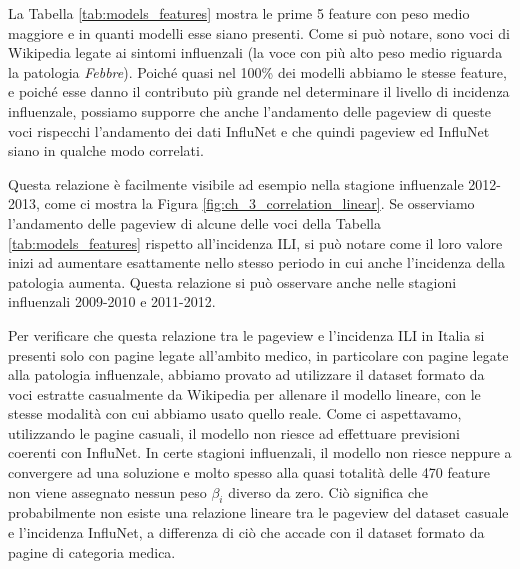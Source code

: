 La Tabella \ref{tab:models_features} mostra le prime 5 feature con peso medio maggiore e in quanti modelli 
esse siano presenti. Come si può notare, sono voci di Wikipedia legate ai sintomi influenzali (la voce con più alto 
peso medio riguarda la patologia \textit{Febbre}). Poiché quasi nel 100\% dei modelli abbiamo le stesse feature, e poiché 
esse danno il contributo più grande nel determinare il livello di incidenza influenzale, possiamo supporre che anche 
l'andamento delle pageview di queste voci rispecchi l'andamento dei dati InfluNet e che quindi pageview ed InfluNet siano in 
qualche modo correlati.
\bigskip

Questa relazione è facilmente visibile ad esempio nella stagione influenzale 2012-2013, come ci mostra la Figura 
\ref{fig:ch_3_correlation_linear}. Se osserviamo l'andamento delle pageview di alcune delle voci della Tabella 
\ref{tab:models_features} rispetto all'incidenza ILI, si può notare come il loro valore inizi ad aumentare esattamente 
nello stesso periodo in cui anche l'incidenza della patologia aumenta. Questa relazione si può osservare anche nelle stagioni 
influenzali 2009-2010 e 2011-2012.
\bigskip

Per verificare che questa relazione tra le pageview e l'incidenza ILI in Italia si presenti solo con pagine legate all'ambito 
medico, in particolare con pagine legate alla patologia influenzale, abbiamo provato ad 
utilizzare il dataset formato da voci estratte casualmente da Wikipedia per allenare il modello lineare, con le stesse 
modalità con cui abbiamo usato quello reale. Come ci aspettavamo, utilizzando le pagine casuali, il modello non riesce ad 
effettuare previsioni coerenti con InfluNet. In certe stagioni influenzali, il modello non riesce neppure a convergere ad una 
soluzione e molto spesso alla quasi totalità delle 470 feature non viene assegnato nessun peso $\beta_i$ diverso da zero. Ciò 
significa che probabilmente non esiste una relazione lineare tra le pageview del dataset casuale e l'incidenza InfluNet, a 
differenza di ciò che accade con il dataset formato da pagine di categoria medica.
\bigskip

